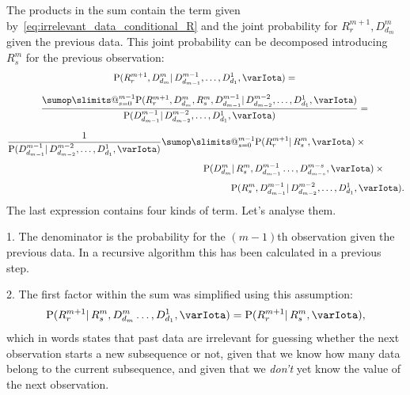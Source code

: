 \documentclass[\ifafour a4paper,12pt,\else a5paper,10pt,\fi%
onecolumn,oneside,article,%
british%
]{memoir}
\makeatletter
\theoremstyle{remark}
\theoremstyle{innote}
\def\sum{\DOTSI\sumop\slimits@}
\newcommand*{\p}{\mathrm{P}}%
\renewcommand*{\|}{\mathpunct{|}}
\newcommand*{\yI}{\varIota}
\makeatother
\begin{document}
The products in the sum contain the term given
by~\eqref{eq:irrelevant_data_conditional_R} and the joint probability for
$R^{m+1}_{r}, D^{m}_{d_{m}}$  given the previous data. This joint probability
 can be decomposed introducing $R^{m}_{s}$ for the previous observation:
\begin{multline}
  \label{eq:prob_R_and_last_decompose}
  \p(R^{m+1}_{r}, D^{m}_{d_{m}} \| D^{m-1}_{d_{m-1}}, \dotsc, D^{1}_{d_{1}}, \yI) 
 ={} \\[2\jot]
  \frac{\sum_{s=0}^{m-1}
    \p(R^{m+1}_{r}, D^{m}_{d_{m}}, R^{m}_{s}, D^{m-1}_{d_{m-1}}
    \| D^{m-2}_{d_{m-2}}, \dotsc, D^{1}_{d_{1}}, \yI)}{
\p(D^{m-1}_{d_{m-1}} \| D^{m-2}_{d_{m-2}}, \dotsc, D^{1}_{d_{1}}, \yI)}
  ={}\\[2\jot]
  \begin{aligned}
    \frac{1}{\p(D^{m-1}_{d_{m-1}} \| D^{m-2}_{d_{m-2}}, \dotsc, D^{1}_{d_{1}}, \yI)}
  \sum_{s=0}^{m-1} \p(R^{m+1}_{r} \| R^{m}_{s}, \yI)
  \times{}\qquad\qquad&\\[\jot]
  \p(D^{m}_{d_{m}} \|
    R^{m}_{s}, D^{m-1}_{d_{m-1}} \dotsc, D^{m-s}_{d_{m-s}}, \yI)
    \times{}\qquad&\\[\jot]
 \p(R^{m}_{s}, D^{m-1}_{d_{m-1}} \|
  D^{m-2}_{d_{m-2}},\dotsc, D^{1}_{d_{1}}, \yI).&
  \end{aligned}
\end{multline}
The last expression contains four kinds of term. Let's analyse them.

1. The denominator is the probability for the $(m-1)$th observation given the
previous data. In a recursive algorithm this has been calculated in a
previous step.

2. The first factor within the sum was simplified using this assumption:
\begin{equation}
  \label{eq:prob_R_and_last_decompose}
  \p(R^{m+1}_{r} \|
  R^{m}_{s},  D^{m}_{d_{m}} \dotsc, D^{1}_{d_{1}}, \yI)
  = \p(R^{m+1}_{r} \|  R^{m}_{s},  \yI),
\end{equation}
which in words states that past data are irrelevant for guessing whether
the next observation starts a new subsequence or not, given that we know
how many data belong to the current subsequence, and given that we
\emph{don't} yet know the value of the next observation.
\end{document}
